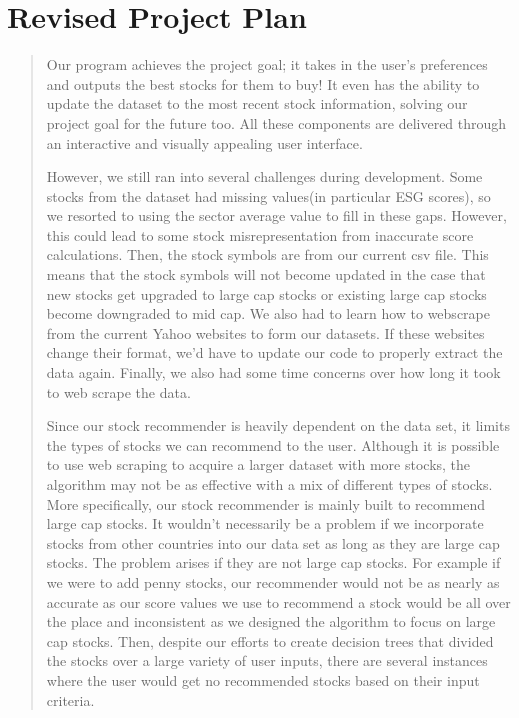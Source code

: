 \documentclass[fontsize=12pt]{article}
\begin{document}
\section*{Revised Project Plan}
\begin{quote}
\noindent
Our program achieves the project goal; it takes in the user’s preferences and outputs the best stocks for them to buy! It even has the ability to update the dataset to the most recent stock information, solving our project goal for the future too. All these components are delivered through an interactive and visually appealing user interface.
	
However, we still ran into several challenges during development. Some stocks from the dataset had missing values(in particular ESG scores), so we resorted to using the sector average value to fill in these gaps. However, this could lead to some stock misrepresentation from inaccurate score calculations. Then, the stock symbols are from our current csv file. This means that the stock symbols will not become updated in the case that new stocks get upgraded to large cap stocks or existing large cap stocks become downgraded to mid cap. We also had to learn how to webscrape from the current Yahoo websites to form our datasets. If these websites change their format, we’d have to update our code to properly extract the data again. Finally, we also had some time concerns over how long it took to web scrape the data.

Since our stock recommender is heavily dependent on the data set, it limits the types of stocks we can recommend to the user. Although it is possible to use web scraping to acquire a larger dataset with more stocks, the algorithm may not be as effective with a mix of different types of stocks. More specifically, our stock recommender is mainly built to recommend large cap stocks. It wouldn't necessarily be a problem if we incorporate stocks from other countries into our data set as long as they are large cap stocks. The problem arises if they are not large cap stocks. For example if we were to add penny stocks, our recommender would not be as nearly as accurate as our score values we use to recommend a stock would be all over the place and inconsistent as we designed the algorithm to focus on large cap stocks. Then, despite our efforts to create decision trees that divided the stocks over a large variety of user inputs, there are several instances where the user would get no recommended stocks based on their input criteria. 


\end{quote}
\end{document}
